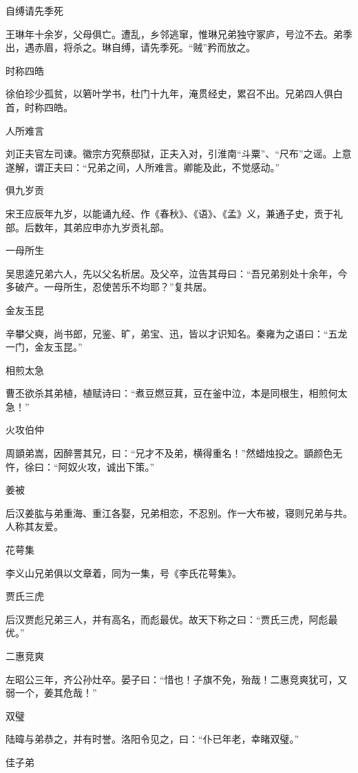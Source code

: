 \documentclass[a4paper,12pt,UTF8,twoside]{ctexbook}
\begin{document}
    自缚请先季死
    
    王琳年十余岁，父母俱亡。遭乱，乡邻逃窜，惟琳兄弟独守冢庐，号泣不去。弟季出，遇赤眉，将杀之。琳自缚，请先季死。“贼”矜而放之。
    
    时称四皓
    
    徐伯珍少孤贫，以箬叶学书，杜门十九年，淹贯经史，累召不出。兄弟四人俱白首，时称四皓。
    
    人所难言
    
    刘正夫官左司谏。徽宗方究蔡邸狱，正夫入对，引淮南“斗粟”、“尺布”之谣。上意遂解，谓正夫曰：“兄弟之间，人所难言。卿能及此，不觉感动。”
    
    俱九岁贡
    
    宋王应辰年九岁，以能诵九经、作《春秋》、《语》、《孟》义，兼通子史，贡于礼部。后数年，其弟应申亦九岁贡礼部。
    
    一母所生
    
    吴思逵兄弟六人，先以父名析居。及父卒，泣告其母曰：“吾兄弟别处十余年，今多破产。一母所生，忍使苦乐不均耶？”复共居。
    
    金友玉昆
    
    辛攀父奭，尚书郎，兄鉴、旷，弟宝、迅，皆以才识知名。秦雍为之语曰：“五龙一门，金友玉昆。”
    
    相煎太急
    
    曹丕欲杀其弟植，植赋诗曰：“煮豆燃豆萁，豆在釜中泣，本是同根生，相煎何太急！”
    
    火攻伯仲
    
    周顗弟嵩，因醉詈其兄，曰：“兄才不及弟，横得重名！”然蜡烛投之。顗颜色无忤，徐曰：“阿奴火攻，诚出下策。”
    
    姜被
    
    后汉姜肱与弟重海、重江各娶，兄弟相恋，不忍别。作一大布被，寝则兄弟与共。人称其友爱。
    
    花萼集
    
    李义山兄弟俱以文章着，同为一集，号《李氏花萼集》。
    
    贾氏三虎
    
    后汉贾彪兄弟三人，并有高名，而彪最优。故天下称之曰：“贾氏三虎，阿彪最优。”
    
    二惠竞爽
    
    左昭公三年，齐公孙灶卒。晏子曰：“惜也！子旗不免，殆哉！二惠竞爽犹可，又弱一个，姜其危哉！”
    
    双璧
    
    陆暐与弟恭之，并有时誉。洛阳令见之，曰：“仆已年老，幸睹双璧。”
    
    佳子弟
    
\end{document}

